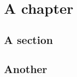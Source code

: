\documentclass[10pt,a4paper]{memoir}
\begin{document}
\chapter{A chapter}\lipsum[1-3]
\section{A section}\lipsum[4-8]
\section{Another}\lipsum[9-12]
\end{document}
